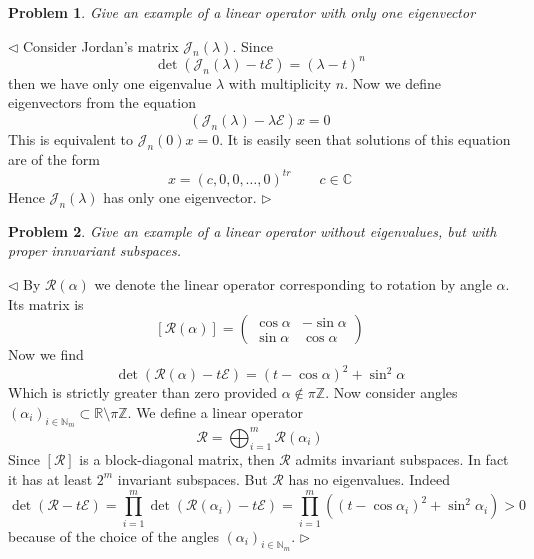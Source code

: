 \documentclass[12pt]{article}
\newtheorem{problem}{Problem}[subsection]
\newenvironment{solution}{\par $\triangleleft$}{$\triangleright$}
\begin{document}
 
\begin{problem} Give an example of a linear operator with only one eigenvector
\end{problem}
\begin{solution} Consider Jordan's matrix $\mathcal{J}_n(\lambda)$. Since
$$
\det(\mathcal{J}_n(\lambda)-t\mathcal{E})=(\lambda-t)^n
$$
then we have only one eigenvalue $\lambda$ with multiplicity $n$. Now we define eigenvectors from the equation
$$
(\mathcal{J}_n(\lambda)-\lambda\mathcal{E})x=0
$$
This is equivalent to $\mathcal{J}_n(0)x=0$. It is easily seen that solutions of this equation are of the form 
$$
x=( c, 0, 0, \ldots, 0 )^{tr}\qquad c\in\mathbb{C}
$$
Hence $\mathcal{J}_n(\lambda)$ has only one eigenvector.
\end{solution}
 
 
\begin{problem} Give an example of a linear operator without eigenvalues, but with proper innvariant subspaces.
\end{problem}
\begin{solution} By $\mathcal{R}(\alpha)$ we denote the linear operator corresponding to rotation by angle $\alpha$. Its matrix is
$$
[\mathcal{R}(\alpha)]=\begin{pmatrix} \cos\alpha & -\sin\alpha\\\sin\alpha &\cos\alpha\end{pmatrix}
$$
Now we find
$$
\det(\mathcal{R(\alpha)}-t\mathcal{E})=(t-\cos\alpha)^2+\sin^2\alpha
$$
Which is strictly greater than zero provided $\alpha\notin\pi \mathbb{Z}$. Now consider angles $(\alpha_i)_{i\in\mathbb{N}_m}\subset\mathbb{R}\setminus \pi\mathbb{Z}$. We define a linear operator
$$
\mathcal{R}=\bigoplus_{i=1}^m\mathcal{R}(\alpha_i)
$$
Since $[\mathcal{R}]$ is a block-diagonal matrix, then $\mathcal{R}$ admits invariant subspaces. In fact it has at least $2^m$ invariant subspaces. But $\mathcal{R}$ has no eigenvalues. Indeed
$$
\det(\mathcal{R}-t\mathcal{E})=\prod_{i=1}^m\det(\mathcal{R}(\alpha_i)-t\mathcal{E})=\prod_{i=1}^m((t-\cos\alpha_i)^2+\sin^2\alpha_i)>0
$$
because of the choice of the angles $(\alpha_i)_{i\in\mathbb{N}_m}$.
\end{solution}
 
\end{document}
